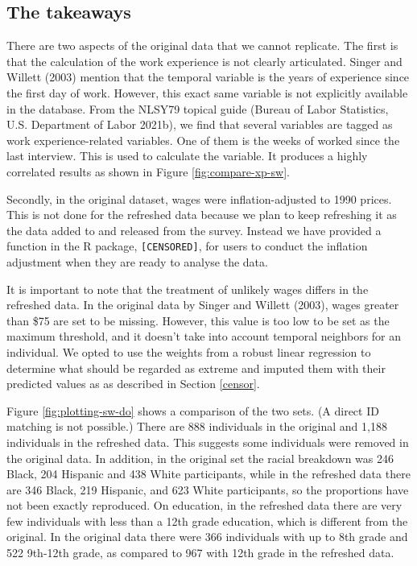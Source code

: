 \documentclass{article}
\begin{document}
\hypertarget{takeaways}{%
\subsection{The takeaways}\label{takeaways}}

There are two aspects of the original data that we cannot replicate. The first is that the calculation of the work experience is not clearly articulated. Singer and Willett (2003) mention that the temporal variable is the years of experience since the first day of work. However, this exact same variable is not explicitly available in the database. From the NLSY79 topical guide (Bureau of Labor Statistics, U.S. Department of Labor 2021b), we find that several variables are tagged as work experience-related variables. One of them is the weeks of worked since the last interview. This is used to calculate the variable. It produces a highly correlated results as shown in Figure \ref{fig:compare-xp-sw}.

Secondly, in the original dataset, wages were inflation-adjusted to 1990 prices. This is not done for the refreshed data because we plan to keep refreshing it as the data added to and released from the survey. Instead we have provided a function in the R package, \texttt{[CENSORED]}, for users to conduct the inflation adjustment when they are ready to analyse the data.

It is important to note that the treatment of unlikely wages differs in the refreshed data. In the original data by Singer and Willett (2003), wages greater than \$75 are set to be missing. However, this value is too low to be set as the maximum threshold, and it doesn't take into account temporal neighbors for an individual. We opted to use the weights from a robust linear regression to determine what should be regarded as extreme and imputed them with their predicted values as as described in Section \ref{censor}.

Figure \ref{fig:plotting-sw-do} shows a comparison of the two sets. (A direct ID matching is not possible.) There are 888 individuals in the original and 1,188 individuals in the refreshed data. This suggests some individuals were removed in the original data.
In addition, in the original set the racial breakdown was 246 Black, 204 Hispanic and 438 White participants, while in the refreshed data there are 346 Black, 219 Hispanic, and 623 White participants, so the proportions have not been exactly reproduced. On education, in the refreshed data there are very few individuals with less than a 12th grade education, which is different from the original. In the original data there were 366 individuals with up to 8th grade and 522 9th-12th grade, as compared to 967 with 12th grade in the refreshed data.
\end{document}
